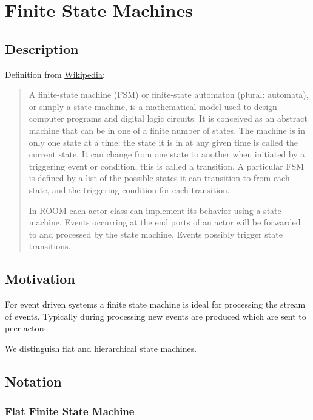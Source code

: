 \section{Finite State Machines}

\subsection{Description}

Definition from \href{http://en.wikipedia.org/wiki/Finite-state\_machine}{Wikipedia}:

\begin{quote}
A finite-state machine (FSM) or finite-state automaton (plural: automata), or simply a state machine, is a mathematical model used to design computer programs and digital logic circuits. It is conceived as an abstract machine that can be in one of a finite number of states. The machine is in only one state at a time; the state it is in at any given time is called the current state. It can change from one state to another when initiated by a triggering event or condition, this is called a transition. A particular FSM is defined by a list of the possible states it can transition to from each state, and the triggering condition for each transition.

In ROOM each actor class can implement its behavior using a state machine. Events occurring at the end ports of an actor will be forwarded to and processed by the state machine. Events possibly trigger state transitions.
\end{quote}

\subsection{Motivation}

For event driven systems a finite state machine is ideal for processing the stream of events. Typically during processing new events are produced which are sent to peer actors.

We distinguish flat and hierarchical state machines.

\subsection{Notation}

\subsubsection{Flat Finite State Machine}

